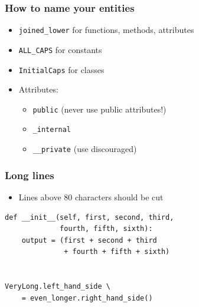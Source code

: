 \documentclass[11pt]{beamer}
\begin{document}
\begin{frame}[fragile]\frametitle{How to name your entities}
\label{sec-2_4}


\begin{itemize}
\item \texttt{joined\_lower} for functions, methods, attributes
\item \texttt{ALL\_CAPS} for constants
\item \texttt{InitialCaps} for classes
\item Attributes:

\begin{itemize}
\item \texttt{public} (never use public attributes!)
\item \texttt{\_internal}
\item \texttt{\_\_private} (use discouraged)
\end{itemize}

\end{itemize}
\end{frame}
\begin{frame}[fragile]\frametitle{Long lines}
\label{sec-2_5}


\begin{itemize}
\item Lines above 80 characters should be cut
\end{itemize}

\begin{lstlisting}
def __init__(self, first, second, third,
             fourth, fifth, sixth):
    output = (first + second + third
              + fourth + fifth + sixth)


VeryLong.left_hand_side \
    = even_longer.right_hand_side()
\end{lstlisting}
\end{frame}
\end{document}
